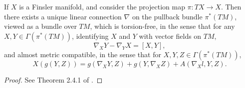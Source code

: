 \begin{prop}
  If $X$ is a Finsler manifold, and consider the projection map $\pi: TX \to X$. Then there exists a unique linear connection $\nabla$ on the pullback bundle $\pi^*(TM)$, viewed as a bundle over $TM$, which is torsion-free, in the sense that for any $X,Y \in \Gamma(\pi^*(TM))$, identifying $X$ and $Y$ with vector fields on $TM$,
  \[ \nabla_X Y - \nabla_Y X = [X,Y], \]
  and almost metric compatible, in the sense that for $X,Y,Z \in \Gamma(\pi^*(TM))$,
  \[ X(g(Y,Z)) = g(\nabla_X Y, Z) + g(Y, \nabla_X Z) + A(\nabla_X l, Y, Z). \]
\end{prop}
\begin{proof}
  See Theorem 2.4.1 of \cite{BaoChern}. %
\end{proof}

